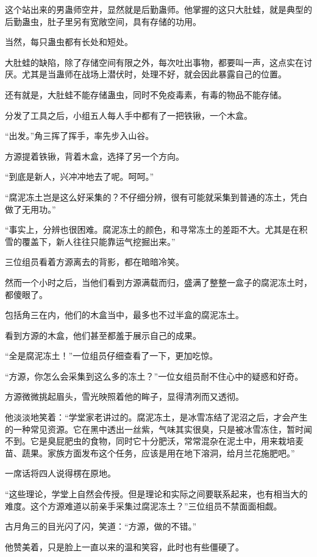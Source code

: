 \begin{this_body}
这个站出来的男蛊师空井，显然就是后勤蛊师。他掌握的这只大肚蛙，就是典型的后勤蛊虫，肚子里另有宽敞空间，具有存储的功用。

当然，每只蛊虫都有长处和短处。

大肚蛙的缺陷，除了存储空间有限之外，每次吐出事物，都要叫一声，这点实在讨厌。尤其是当蛊师在战场上潜伏时，处理不好，就会因此暴露自己的位置。

还有就是，大肚蛙不能存储蛊虫，同时不免疫毒素，有毒的物品不能存储。

分发了工具之后，小组五人每人手中都有了一把铁锹，一个木盒。

“出发。”角三挥了挥手，率先步入山谷。

方源提着铁锹，背着木盒，选择了另一个方向。

“到底是新人，兴冲冲地去了呢。呵呵。”

“腐泥冻土岂是这么好采集的？不仔细分辨，很有可能就采集到普通的冻土，凭白做了无用功。”

“事实上，分辨也很困难。腐泥冻土的颜色，和寻常冻土的差距不大。尤其是在积雪的覆盖下，新人往往只能靠运气挖掘出来。”

三位组员看着方源离去的背影，都在暗暗冷笑。

然而一个小时之后，当他们看到方源满载而归，盛满了整整一盒子的腐泥冻土时，都傻眼了。

包括角三在内，他们的木盒当中，最多也不过半盒的腐泥冻土。

看到方源的木盒，他们甚至都羞于展示自己的成果。

“全是腐泥冻土！”一位组员仔细查看了一下，更加吃惊。

“方源，你怎么会采集到这么多的冻土？”一位女组员耐不住心中的疑惑和好奇。

方源微微挑起眉头，雪光映照着他的眸子，显得清冽而又透彻。

他淡淡地笑着：“学堂家老讲过的。腐泥冻土，是冰雪冻结了泥沼之后，才会产生的一种常见资源。它在黑中透出一丝紫，气味其实很臭，只是被冰雪冻住，暂时闻不到。它是臭屁肥虫的食物，同时它十分肥沃，常常混杂在泥土中，用来栽培麦苗、蔬果。家族方面发布这个任务，应该是用在地下溶洞，给月兰花施肥吧。”

一席话将四人说得楞在原地。

“这些理论，学堂上自然会传授。但是理论和实际之间要联系起来，也有相当大的难度。这个方源难道以前亲手采集过腐泥冻土？”三位组员不禁面面相觑。

古月角三的目光闪了闪，笑道：“方源，做的不错。”

他赞美着，只是脸上一直以来的温和笑容，此时也有些僵硬了。


\end{this_body}
